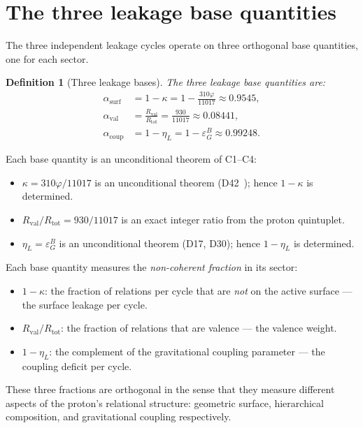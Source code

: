 \documentclass[12pt,a4paper]{article}
\newtheorem{definition}[theorem]{Definition}
\newcommand{\Rtot}{R_{\mathrm{tot}}}
\newcommand{\Rval}{R_{\mathrm{val}}}
\newcommand{\kap}{\kappa}
\newcommand{\etaL}{\eta_L}
\newcommand{\vp}{\varphi}
\begin{document}
\section{The three leakage base quantities}
\label{sec:bases}

The three independent leakage cycles operate on three orthogonal base quantities, one for each sector.

\begin{definition}[Three leakage bases]
\label{def:bases}
The three leakage base quantities are:
\begin{align}
\alpha_{\mathrm{surf}} &= 1 - \kap = 1 - \frac{310\vp}{11017} \approx 0.9545, \label{eq:alpha_surf} \\
\alpha_{\mathrm{val}} &= \frac{\Rval}{\Rtot} = \frac{930}{11017} \approx 0.08441, \label{eq:alpha_val} \\
\alpha_{\mathrm{coup}} &= 1 - \etaL = 1 - \varepsilon_G^B \approx 0.99248. \label{eq:alpha_coup}
\end{align}
\end{definition}

Each base quantity is an unconditional theorem of C1--C4:
\begin{itemize}[leftmargin=2em]
\item $\kap = 310\vp/11017$ is an unconditional theorem (D42~\cite{PDL_D42_2026}); hence $1-\kap$ is determined.
\item $\Rval/\Rtot = 930/11017$ is an exact integer ratio from the proton quintuplet.
\item $\etaL = \varepsilon_G^B$ is an unconditional theorem (D17, D30); hence $1-\etaL$ is determined.
\end{itemize}

Each base quantity measures the \emph{non-coherent fraction} in its sector:
\begin{itemize}[leftmargin=2em]
\item $1-\kap$: the fraction of relations per cycle that are \emph{not} on the active surface — the surface leakage per cycle.
\item $\Rval/\Rtot$: the fraction of relations that are valence — the valence weight.
\item $1-\etaL$: the complement of the gravitational coupling parameter — the coupling deficit per cycle.
\end{itemize}
These three fractions are orthogonal in the sense that they measure different aspects of the proton's relational structure: geometric surface, hierarchical composition, and gravitational coupling respectively.
\end{document}
